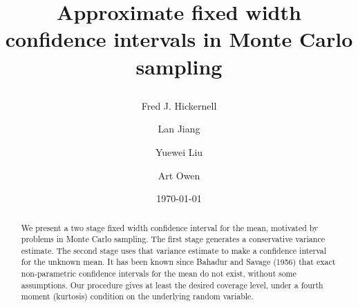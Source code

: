 \documentclass{article}
\begin{document}
\date{\today}
\title{
Approximate fixed width confidence intervals in Monte Carlo sampling
%
%
%
\author{Fred J. Hickernell
\and
Lan Jiang
\and Yuewei Liu
\and Art Owen 
}
}



\maketitle

\begin{abstract}
We present a two stage fixed width confidence interval for 
the mean, motivated by problems in Monte Carlo sampling.  
The first stage generates a conservative variance estimate.
The second stage uses that variance estimate to make a confidence
interval for the unknown mean.  It has been known since
Bahadur and Savage (1956) that exact non-parametric confidence
intervals for the mean do not exist, without some assumptions.
Our procedure gives at least the desired coverage level, under
a fourth moment (kurtosis) condition on the underlying random variable.
\end{abstract}
\nocite{baha:sava:1956}

\newcommand\real{\mathbb{R}}
\newcommand\natu{\mathbb{N}}
\newcommand\e{\mathbb{E}}
\newcommand{\bsx}{\boldsymbol{x}}
\newcommand{\bsX}{\boldsymbol{X}}
\newcommand{\rd}{\,\mathrm{d}}
\newcommand{\dnorm}{\mathcal{N}}
\newcommand{\Prob}{\Pr}

\newcommand{\abs}[1]{\left|#1\right|}
\newcommand{\var}{\mathrm{Var}}
\newcommand{\hmu}{\hat{\mu}}
\newcommand{\hv}{\hat{v}}
\newcommand{\kurt}{\mathrm{kurt}}
\newcommand{\sign}{\mathrm{sign}}
\newcommand{\fudge}{\mathfrak{C}}
\newcommand{\naturals}{\mathbb{N}}
\newcommand{\dif}{\rd}
\end{document}
